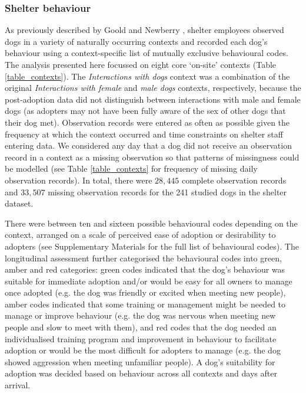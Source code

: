 \documentclass[fleqn,10pt]{wlscirep}
\begin{document}
\subsubsection*{Shelter behaviour}
As previously described by Goold and Newberry \cite{goold2017modelling,goold2017aggressiveness}, shelter employees observed dogs in a variety of naturally occurring contexts and recorded each dog's behaviour using a context-specific list of mutually exclusive behavioural codes. The analysis presented here focussed on eight core ‘on-site' contexts (Table \ref{table_contexts}). The \textit{Interactions with dogs} context was a combination of the original \textit{Interactions with female} and \textit{male dogs} contexts, respectively, because the post-adoption data did not distinguish between interactions with male and female dogs (as adopters may not have been fully aware of the sex of other dogs that their dog met). Observation records were entered as often as possible given the frequency at which the context occurred and time constraints on shelter staff entering data. We considered any day that a dog did not receive an observation record in a context as a missing observation so that patterns of missingness could be modelled (see Table \ref{table_contexts} for frequency of missing daily observation records). In total, there were $28,445$ complete observation records and $33,507$ missing observation records for the 241 studied dogs in the shelter dataset.

There were between ten and sixteen possible behavioural codes depending on the context, arranged on a scale of perceived ease of adoption or desirability to adopters (see Supplementary Materials for the full list of behavioural codes). The longitudinal assessment further categorised the behavioural codes into green, amber and red categories: green codes indicated that the dog's behaviour was suitable for immediate adoption and/or would be easy for all owners to manage once adopted (e.g. the dog was friendly or excited when meeting new people), amber codes indicated that some training or management might be needed to manage or improve behaviour (e.g. the dog was nervous when meeting new people and slow to meet with them), and red codes that the dog needed an individualised training program and improvement in behaviour to facilitate adoption or would be the most difficult for adopters to manage (e.g. the dog showed aggression when meeting unfamiliar people). A dog's suitability for adoption was decided based on behaviour across all contexts and days after arrival.
\end{document}
